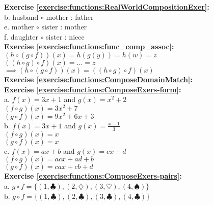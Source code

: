 
\noindent\textbf{Exercise \ref{exercise:functions:RealWorldCompositionExer}:}\\
b. husband $\circ$ mother : father\\
e. mother $\circ$ sister : mother\\
f. daughter $\circ$ sister : niece\\

\noindent\textbf{Exercise \ref{exercise:functions:func_comp_assoc}:}\\
$(h\circ(g\circ f))(x)=h(g(y))=h(w)=z$\\
$((h\circ g)\circ f)(x)=...=z$\\
$\implies (h\circ(g\circ f))(x)=((h\circ g)\circ f)(x)$\\

\noindent\textbf{Exercise \ref{exercise:functions:ComposeDomainMatch}:}\\

\noindent\textbf{Exercise \ref{exercise:functions:ComposeExers-form}:}\\
a. $f(x)=3x+1$ and $g(x)=x^2+2$\\
$(f\circ g)(x)=3x^2+7$\\
$(g\circ f)(x)=9x^2+6x+3$\\
b. $f(x)=3x+1$ and $g(x)=\displaystyle\frac{x-1}{3}$\\
$(f\circ g)(x)=x$\\
$(g\circ f)(x)=x$\\
c. $f(x)=ax+b$ and $g(x)=cx+d$\\
$(f\circ g)(x)=acx+ad+b$\\
$(g\circ f)(x)=cax+cb+d$\\

\noindent\textbf{Exercise \ref{exercise:functions:ComposeExers-pairs}:}\\
a. $g\circ f=\{(1,\clubsuit),(2,\diamondsuit),(3,\heartsuit),(4,\spadesuit)\}$\\
b. $g\circ f=\{(1,\clubsuit),(2,\clubsuit),(3,\clubsuit),(4,\clubsuit)\}$\\

